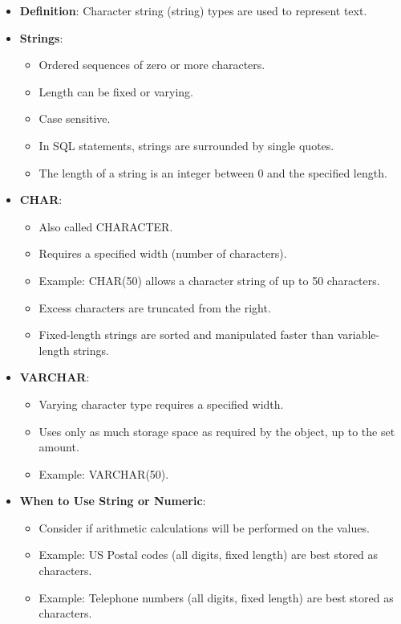 \documentclass{article}
\begin{document}
\begin{itemize}
    \item \textbf{Definition}: Character string (string) types are used to represent text.
    \item \textbf{Strings}:
    \begin{itemize}
        \item Ordered sequences of zero or more characters.
        \item Length can be fixed or varying.
        \item Case sensitive.
        \item In SQL statements, strings are surrounded by single quotes.
        \item The length of a string is an integer between 0 and the specified length.
    \end{itemize}
    \item \textbf{CHAR}:
    \begin{itemize}
        \item Also called CHARACTER.
        \item Requires a specified width (number of characters).
        \item Example: CHAR(50) allows a character string of up to 50 characters.
        \item Excess characters are truncated from the right.
        \item Fixed-length strings are sorted and manipulated faster than variable-length strings.
    \end{itemize}
    \item \textbf{VARCHAR}:
    \begin{itemize}
        \item Varying character type requires a specified width.
        \item Uses only as much storage space as required by the object, up to the set amount.
        \item Example: VARCHAR(50).
    \end{itemize}
    \item \textbf{When to Use String or Numeric}:
    \begin{itemize}
        \item Consider if arithmetic calculations will be performed on the values.
        \item Example: US Postal codes (all digits, fixed length) are best stored as characters.
        \item Example: Telephone numbers (all digits, fixed length) are best stored as characters.
    \end{itemize}
\end{itemize}
\end{document}

